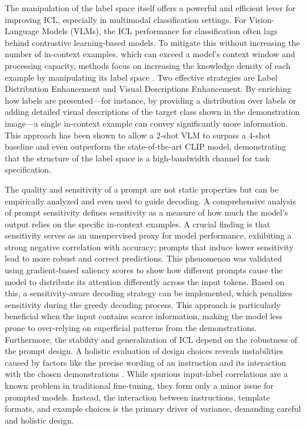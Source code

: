 \documentclass[11pt]{article}
\begin{document}
The manipulation of the label space itself offers a powerful and efficient lever for improving ICL, especially in multimodal classification settings. For Vision-Language Models (VLMs), the ICL performance for classification often lags behind contrastive learning-based models. To mitigate this without increasing the number of in-context examples, which can exceed a model's context window and processing capacity, methods focus on increasing the knowledge density of each example by manipulating its label space \cite{ref84}. Two effective strategies are Label Distribution Enhancement and Visual Descriptions Enhancement. By enriching how labels are presented---for instance, by providing a distribution over labels or adding detailed visual descriptions of the target class shown in the demonstration image---a single in-context example can convey significantly more information. This approach has been shown to allow a 2-shot VLM to surpass a 4-shot baseline and even outperform the state-of-the-art CLIP model, demonstrating that the structure of the label space is a high-bandwidth channel for task specification.

The quality and sensitivity of a prompt are not static properties but can be empirically analyzed and even used to guide decoding. A comprehensive analysis of prompt sensitivity \cite{ref64} defines sensitivity as a measure of how much the model's output relies on the specific in-context examples. A crucial finding is that sensitivity serves as an unsupervised proxy for model performance, exhibiting a strong negative correlation with accuracy; prompts that induce lower sensitivity lead to more robust and correct predictions. This phenomenon was validated using gradient-based saliency scores to show how different prompts cause the model to distribute its attention differently across the input tokens. Based on this, a sensitivity-aware decoding strategy can be implemented, which penalizes sensitivity during the greedy decoding process. This approach is particularly beneficial when the input contains scarce information, making the model less prone to over-relying on superficial patterns from the demonstrations. Furthermore, the stability and generalization of ICL depend on the robustness of the prompt design. A holistic evaluation of design choices reveals instabilities caused by factors like the precise wording of an instruction and its interaction with the chosen demonstrations \cite{ref85}. While spurious input-label correlations are a known problem in traditional fine-tuning, they form only a minor issue for prompted models. Instead, the interaction between instructions, template formats, and example choices is the primary driver of variance, demanding careful and holistic design.
\end{document}
